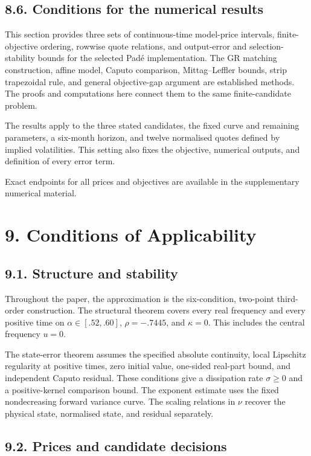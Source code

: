 \documentclass[a4paper,11pt]{article}
\begin{document}
\subsection*{8.6. Conditions for the numerical results}

This section provides three sets of continuous-time model-price intervals, finite-objective ordering, rowwise quote relations, and output-error and selection-stability bounds for the selected Padé implementation. The GR matching construction, affine model, Caputo comparison, Mittag–Leffler bounds, strip trapezoidal rule, and general objective-gap argument are established methods. The proofs and computations here connect them to the same finite-candidate problem.

The results apply to the three stated candidates, the fixed curve and remaining parameters, a six-month horizon, and twelve normalised quotes defined by implied volatilities. This setting also fixes the objective, numerical outputs, and definition of every error term.

Exact endpoints for all prices and objectives are available in the supplementary numerical material.

\section*{9. Conditions of Applicability}

\subsection*{9.1. Structure and stability}

Throughout the paper, the approximation is the six-condition, two-point third-order construction. The structural theorem covers every real frequency and every positive time on \(\alpha\in[.52,.60]\), \(\rho=-.7445\), and \(\kappa=0\). This includes the central frequency \(u=0\).

The state-error theorem assumes the specified absolute continuity, local Lipschitz regularity at positive times, zero initial value, one-sided real-part bound, and independent Caputo residual. These conditions give a dissipation rate \(\sigma\ge0\) and a positive-kernel comparison bound. The exponent estimate uses the fixed nondecreasing forward variance curve. The scaling relations in \(\nu\) recover the physical state, normalised state, and residual separately.

\subsection*{9.2. Prices and candidate decisions}
\end{document}
